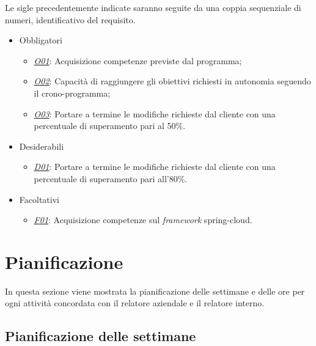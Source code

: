 Le sigle precedentemente indicate saranno seguite da una coppia sequenziale di numeri, identificativo del requisito.

\begin{itemize}[noitemsep]
	\item Obbligatori
	\begin{itemize}
		\item \underline{\textit{O01}}: Acquisizione competenze previste dal programma;
		\item \underline{\textit{O02}}: Capacità di raggiungere gli obiettivi richiesti in autonomia seguendo il crono-programma;
		\item \underline{\textit{O03}}: Portare a termine le modifiche richieste dal cliente con una percentuale di superamento pari al 50\%.
	\end{itemize}
	\item Desiderabili
	\begin{itemize}
		\item \underline{\textit{D01}}: Portare a termine le modifiche richieste dal cliente con una percentuale di superamento pari all'80\%.
	\end{itemize}
	\item Facoltativi
	\begin{itemize}
		\item \underline{\textit{F01}}: Acquisizione competenze sul \textit{framework} \gls{spring-cloud}\gloss.
	\end{itemize}
\end{itemize}


\section{Pianificazione}

In questa sezione viene mostrata la pianificazione delle settimane e delle ore per ogni attività concordata con il relatore aziendale e il relatore interno.

\subsection{Pianificazione delle settimane}

